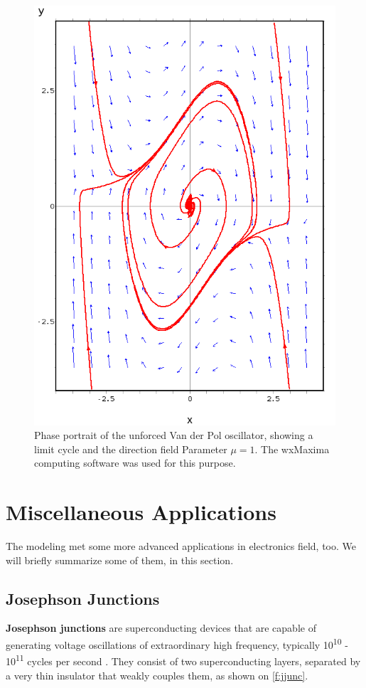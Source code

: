 \documentclass[journal]{IEEEtran}
\begin{document}
\begin{figure}[ht!]
	\centering
	\includegraphics[width=.85\linewidth]{vdp_maxima}
	\caption{Phase portrait of the unforced Van der Pol oscillator, showing a limit cycle and the direction field Parameter $\mu=1$. The wxMaxima computing software was used for this purpose. }
	\label{f:vdp_m}
\end{figure}


\section{Miscellaneous Applications}
The modeling met some more advanced applications in electronics field, too. We will briefly summarize some of them, in this section.

\subsection{Josephson Junctions}
\textbf{Josephson junctions} are superconducting devices that are capable of generating voltage oscillations of extraordinary high frequency, typically 10\textsuperscript{10} - 10\textsuperscript{11} cycles per second \cite{van1981principles}. They consist of two superconducting layers, separated by a very thin insulator that weakly couples them, as shown on \cref{f:jjunc}.
\end{document}
